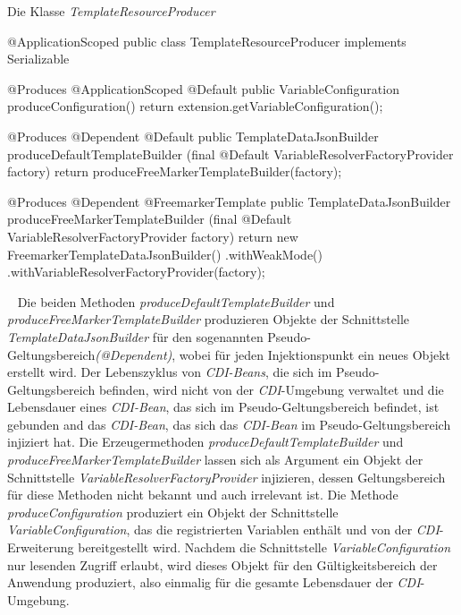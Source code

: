 \begin{program}[h]
\caption{Die Klasse \emph{TemplateResourceProducer}}
\label{prog:templateResourceProducer}
\begin{JavaCode}
@ApplicationScoped
public class TemplateResourceProducer implements Serializable {
    @Produces
    @ApplicationScoped
    @Default
    public VariableConfiguration produceConfiguration() {
        return extension.getVariableConfiguration();
    }
    
    @Produces
    @Dependent
    @Default
    public TemplateDataJsonBuilder produceDefaultTemplateBuilder
          (final @Default VariableResolverFactoryProvider factory) {
        return produceFreeMarkerTemplateBuilder(factory);
    }

    @Produces
    @Dependent
    @FreemarkerTemplate
    public TemplateDataJsonBuilder produceFreeMarkerTemplateBuilder
           (final @Default VariableResolverFactoryProvider factory) {
        return new FreemarkerTemplateDataJsonBuilder()
                      .withWeakMode()
                      .withVariableResolverFactoryProvider(factory);
    }
}
\end{JavaCode}
\end{program}
\ \newline
Die beiden Methoden \emph{produceDefaultTemplateBuilder} und \emph{produceFreeMarkerTemplateBuilder} produzieren Objekte der Schnittstelle \emph{TemplateDataJsonBuilder} für den sogenannten Pseudo-Geltungsbereich\emph{(@Dependent)}, wobei für jeden Injektionspunkt ein neues Objekt erstellt wird. Der Lebenszyklus von \emph{CDI-Beans}, die sich im Pseudo-Geltungsbereich befinden, wird nicht von der \emph{CDI}-Umgebung verwaltet und die Lebensdauer eines \emph{CDI-Bean}, das sich im Pseudo-Geltungsbereich befindet, ist gebunden and das \emph{CDI-Bean}, das sich das \emph{CDI-Bean} im Pseudo-Geltungsbereich injiziert hat. Die Erzeugermethoden \emph{produceDefaultTemplateBuilder} und \emph{produceFreeMarkerTemplateBuilder} lassen sich als Argument ein Objekt der Schnittstelle \emph{VariableResolverFactoryProvider} injizieren, dessen Geltungsbereich für diese Methoden nicht bekannt und auch irrelevant ist.
\newline
\newline
Die Methode \emph{produceConfiguration} produziert ein Objekt der Schnittstelle  \emph{VariableConfiguration}, das die registrierten Variablen enthält und von der \emph{CDI}-Erweiterung bereitgestellt wird. Nachdem die Schnittstelle  \emph{VariableConfiguration} nur lesenden Zugriff erlaubt, wird dieses Objekt für den Gültigkeitsbereich der Anwendung produziert, also einmalig für die gesamte Lebensdauer der \emph{CDI}-Umgebung.
